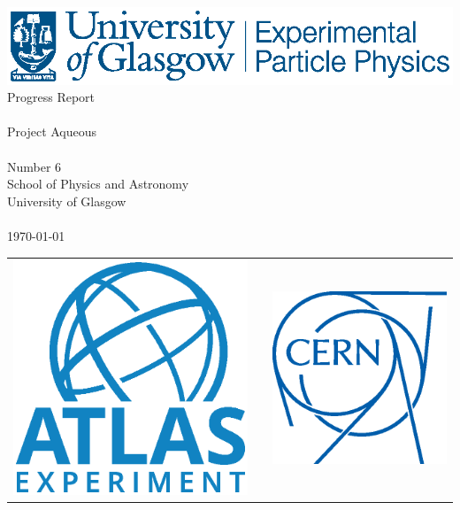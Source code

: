     \thispagestyle{empty}
    \begin{center}
        \includegraphics[height=3 cm]{images/ExperPartPhys_blue.eps}
        \vspace{3.0 cm}\\
        {\LARGE
        Progress Report\\
        \mbox{}\\
        Project Aqueous}\\
        \vspace{1.0 cm}
        \mbox{}\\
        \large Number 6\\
        \vspace{\fill}
        \vspace{\fill}
        School of Physics and Astronomy\\
        University of Glasgow\\
        \mbox{}\\
        \timeC\today
        \mbox{}\\
        \vspace{\fill}
        \begin{tabular}{cp{4.9 cm}c}
        \includegraphics[height=2.4 cm]{images/ATLAS-Logo-Square-Blue-RGB.eps}&&\includegraphics[height=2.4 cm]{images/CERN_LogoOutline.eps}\\
        \end{tabular}
        \vspace{\fill}
    \end{center}

